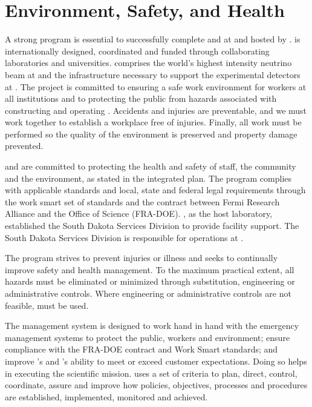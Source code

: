 \chapter{Environment, Safety, and Health}
\label{vl:tc-ESH}


A strong  program is essential to successfully complete
 and  at  and hosted by
\fnal.   is internationally designed,
coordinated and funded through collaborating laboratories and
universities.   comprises the
world's highest intensity neutrino beam at \fnal and the
infrastructure necessary to support the experimental detectors at
. The  project is committed to ensuring a
safe work environment for  workers at all
institutions and to protecting the public from hazards associated with
constructing and operating .  Accidents and
injuries are preventable, and we must work together to
establish a workplace free of injuries.  Finally, all work must be
performed so the quality of the environment is preserved
and property damage prevented.

\fnal and  are committed to protecting the health and
safety of staff, the community and the environment, as stated in the
 integrated  plan.  The
 program complies with applicable standards and local,
state and federal legal requirements through the \fnal work smart set
of standards and the contract between Fermi Research Alliance and the
 Office of Science (FRA-DOE). \fnal, as the host
laboratory, established the South Dakota Services Division to provide
facility support.  The South Dakota Services Division is responsible
for  operations at .

The   program strives to prevent
injuries or illness and seeks to continually improve safety and health
management.  To the maximum practical extent, all hazards must be
eliminated or minimized through substitution, engineering or
administrative controls.  Where engineering or administrative controls
are not feasible,  must be used.

The   management system is
designed to work hand in hand with the  emergency
management systems to protect the public, workers and environment;
ensure compliance with the FRA-DOE contract and \fnal Work Smart
standards; and improve \fnal's and 's ability to meet or
exceed customer expectations. Doing so helps in executing the
scientific mission.  \fnal uses a set of criteria to plan, direct,
control, coordinate, assure and improve how  policies,
objectives, processes and procedures are established, implemented,
monitored and achieved.

